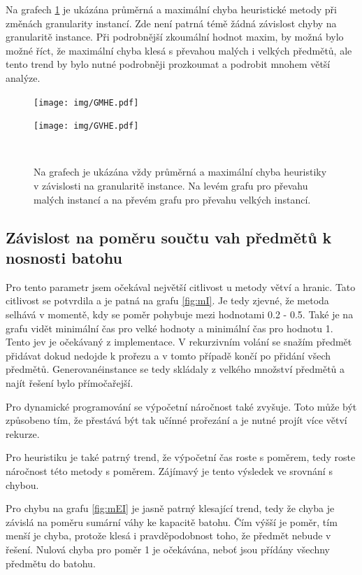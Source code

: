 \documentclass[11pt]{article}
\begin{document}
Na grafech \ref{fig:GOEI} je ukázána průměrná a maximální chyba heuristické metody při změnách granularity instancí. Zde není patrná témě žádná závislost chyby na granularitě instance. Při podrobnější zkoumální hodnot maxim, by možná bylo možné říct, že maximální chyba klesá s převahou malých i velkých předmětů, ale tento trend by bylo nutné podrobněji prozkoumat a podrobit mnohem větší analýze.
 
 \begin{figure}
	\centering
    \begin{minipage}[c]{0.49\textwidth}
        \centering\texttt{[image: img/GMHE.pdf]} 
    \end{minipage}
    \begin{minipage}[c]{0.49\textwidth}
        \centering \texttt{[image: img/GVHE.pdf]} 
    \end{minipage}
    \\
   \caption{Na grafech je ukázána vždy průměrná a maximální chyba heuristiky v závislosti na granularitě instance. Na levém grafu pro převahu malých instancí a na převém grafu pro převahu velkých instancí.}\label{fig:GOEI}
    \end{figure} 
    
\subsection{Závislost na poměru součtu vah předmětů k nosnosti batohu}
Pro tento parametr jsem očekával největší citlivost u metody větví a hranic. Tato citlivost se potvrdila a je patná na grafu \ref{fig:mI}. Je tedy zjevné, že metoda selhává v momentě, kdy se poměr pohybuje mezi hodnotami 0.2 - 0.5. Také je na grafu vidět minimální čas pro velké hodnoty a minimální čas pro hodnotu 1. Tento jev je očekávaný z implementace. V rekurzivním volání se snažím předmět přidávat dokud nedojde k prořezu a v tomto případě končí po přidání všech předmětů. Generovanéinstance se tedy skládaly z velkého množství předmětů a najít řešení bylo přímočařejší.

Pro dynamické programování se výpočetní náročnost také zvyšuje. Toto může být způsobeno tím, že přestává být tak učínné prořezání a je nutné projít více větví rekurze.

Pro heuristiku je také patrný trend, že výpočetní čas roste s poměrem, tedy roste náročnost této metody s poměrem. Zájímavý je tento výsledek ve srovnání s chybou.

Pro chybu na grafu \ref{fig:mEI} je jasně patrný klesající trend, tedy že chyba je závislá na poměru sumární váhy ke kapacitě batohu. Čím výšší je poměr, tím menší je chyba, protože klesá i pravděpodobnost toho, že předmět nebude v řešení. Nulová chyba pro poměr 1 je očekávána, neboť jsou přídány všechny předmětu do batohu.
\end{document}
